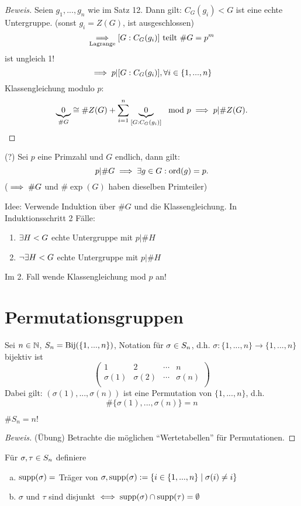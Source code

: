 \documentclass[a4paper]{report}
\begin{document}
\begin{proof}[Beweis]
  Seien $g_{1}, ..., g_{n}$ wie im Satz 12. Dann gilt: $C_{G}(g_{i}) < G$ ist eine echte Untergruppe. (sonst $g_{i} = Z(G)$, ist ausgeschlossen)
  \[\underset{\text{Lagrange}}{\implies} [G: C_{G}(g_{i})] \text{ teilt } \# G = p^{m}\]
  ist ungleich 1!
  \[ \implies p | [G: C_{G}(g_{i})], \forall i \in \{1, ..., n\}\]
  Klassengleichung modulo $p:$
  \[\underbrace 0_{\# G} \cong \# Z(G) + \sum_{i=1}^n \underbrace 0_{[G : C_{G}(g_{i})]} \mod p \implies p | \# Z(G). \qedhere\]
\end{proof}

\begin{ubng}(?) Sei $p$ eine Primzahl und $G$ endlich, dann gilt:
  \[p | \#G \implies \exists g \in G : \operatorname{ord}(g) = p.\]
  ($\implies \#G$ und $\#\exp(G)$ haben dieselben Primteiler)

  Idee: Verwende Induktion über $\#G$ und die Klassengleichung. In Induktionsschritt 2 Fälle:
  \begin{enumerate}
\item $\exists H < G$ echte Untergruppe mit $p | \#H$
\item $\neg \exists H < G$ echte Untergruppe mit $p | \#H$
  \end{enumerate}
  Im 2. Fall wende Klassengleichung mod $p$ an!
\end{ubng}

\section{Permutationsgruppen}
Sei $n \in \mathbb{N}$, $S_n = \operatorname{Bij}(\{1, ..., n\})$, Notation für $\sigma \in S_n$, d.h. $\sigma : \{1, ..., n\} \to\{1, ..., n\}$ bijektiv ist
\[\begin{pmatrix}
1 & 2 & \cdots & n \\
\sigma(1) & \sigma(2) & \cdots & \sigma(n) \\
  \end{pmatrix}\]
Dabei gilt: $(\sigma(1), ..., \sigma(n))$ ist eine Permutation von $\{1, ..., n\}$, d.h. \[\#\{\sigma(1), ..., \sigma(n)\} = n\]

\begin{kor}
  $\#S_{n} = n!$
\end{kor}
\begin{proof}[Beweis](Übung) Betrachte die möglichen ``Wertetabellen'' für Permutationen.
\end{proof}

\begin{defi}
  Für $\sigma, \tau \in S_n$ definiere
  \begin{enumerate}[(a)]
    \item $\operatorname{supp}(\sigma) =$ Träger von $\sigma, \operatorname{supp}(\sigma) := \{i \in \{1, ..., n\} \mid \sigma(i) \ne i\}$
    \item $\sigma$ und $\tau$ sind disjunkt $\iff \operatorname{supp}(\sigma) \cap \operatorname{supp}(\tau) = \emptyset$
  \end{enumerate}
\end{defi}
\end{document}
